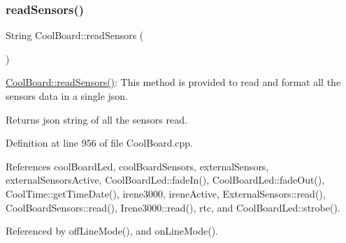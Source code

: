 \subsubsection{\texorpdfstring{read\+Sensors()}{readSensors()}}
{\footnotesize\ttfamily String Cool\+Board\+::read\+Sensors (\begin{DoxyParamCaption}{ }\end{DoxyParamCaption})}

\hyperlink{classCoolBoard_ad03abdce2e65f520bbf2cff0f2d083cf}{Cool\+Board\+::read\+Sensors()}\+: This method is provided to read and format all the sensors data in a single json.

\begin{DoxyReturn}{Returns}
json string of all the sensors read. 
\end{DoxyReturn}


Definition at line 956 of file Cool\+Board.\+cpp.



References cool\+Board\+Led, cool\+Board\+Sensors, external\+Sensors, external\+Sensors\+Active, Cool\+Board\+Led\+::fade\+In(), Cool\+Board\+Led\+::fade\+Out(), Cool\+Time\+::get\+Time\+Date(), irene3000, irene\+Active, External\+Sensors\+::read(), Cool\+Board\+Sensors\+::read(), Irene3000\+::read(), rtc, and Cool\+Board\+Led\+::strobe().



Referenced by off\+Line\+Mode(), and on\+Line\+Mode().


